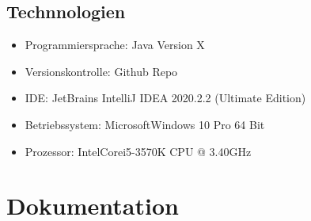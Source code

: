\documentclass[11pt]{article}
\begin{document}
    \subsection{Technnologien}
    \begin{itemize}
        \item Programmiersprache: Java Version X
        \item Versionskontrolle: Github Repo
        \item IDE: JetBrains IntelliJ IDEA 2020.2.2 (Ultimate Edition)
        \item Betriebssystem: Microsoft\textregistered Windows 10 Pro 64 Bit
        \item Prozessor: Intel\textregistered Core\texttrademark i5-3570K CPU @ 3.40GHz
    \end{itemize}

    \newpage

    \section{Dokumentation}
\end{document}
